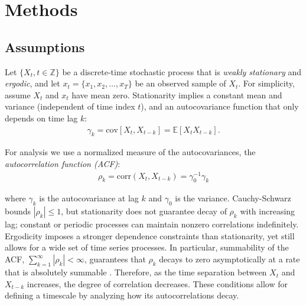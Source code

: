 \documentclass[main.tex]{subfiles}
\begin{document}
\section{Methods}

\subsection{Assumptions} \label{sec:assumptions}

Let $\{X_t, t\in \mathbb{Z}\}$ be a discrete-time stochastic process that is \textit{weakly stationary} and \textit{ergodic}, and let $x_t = \{x_1, x_2, \ldots, x_T\}$ be an observed sample of $X_t$. For simplicity, assume $X_t$ and $x_t$ have mean zero. Stationarity implies a constant mean and variance (independent of time index $t$), and an autocovariance function that only depends on time lag $k$:
\begin{align}
    \gamma_k = \text{cov}[X_t, X_{t-k}] = \mathbb{E}[X_t X_{t-k}].
\end{align}

\noindent For analysis we use a normalized measure of the autocovariances, the \textit{autocorrelation function (ACF)}:
\begin{align} \label{eq:acf}
\rho_k = \text{corr}(X_t, X_{t-k}) = \gamma_0^{-1}\gamma_k
\end{align}

\noindent where $\gamma_k$ is the autocovariance at lag $k$ and $\gamma_0$ is the variance. Cauchy-Schwarz bounds $|\rho_k|\le 1$, but stationarity does not guarantee decay of $\rho_k$ with increasing lag; constant or periodic processes can maintain nonzero correlations indefinitely. Ergodicity imposes a stronger dependence constraints than stationarity, yet still allows for a wide set of time series processes. In particular, summability of the ACF, $\sum_{k=1}^\infty |\rho_k| < \infty$, guarantees that $\rho_k$ decays to zero asymptotically at a rate that is absolutely summable \citep[Chapter~14.7]{hansen_econometrics_2022}. Therefore, as the time separation between $X_t$ and $X_{t-k}$ increases, the degree of correlation decreases. These conditions allow for defining a timescale by analyzing how its autocorrelations decay.\\
\end{document}
